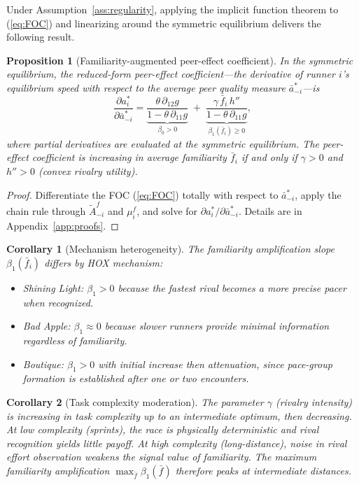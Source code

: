\documentclass[12pt]{article}
\newtheorem{proposition}{Proposition}
\newtheorem{corollary}{Corollary}
\theoremstyle{definition}
\theoremstyle{remark}
\begin{document}
Under Assumption~\ref{ass:regularity}, applying the implicit function theorem
to (\ref{eq:FOC}) and linearizing around the symmetric equilibrium delivers
the following result.

\begin{proposition}[Familiarity-augmented peer-effect coefficient]
\label{prop:main}
In the symmetric equilibrium, the reduced-form peer-effect coefficient---the
derivative of runner $i$'s equilibrium speed with respect to the average peer
quality measure $\bar{a}_{-i}^*$---is
\begin{equation}
\frac{\partial a_i^*}{\partial \bar{a}_{-i}^*} =
\underbrace{\frac{\theta\,\partial_{12}g}{1-\theta\,\partial_{11}g}}_{\beta_0 > 0}
\;+\;
\underbrace{\frac{\gamma\,\bar{f}_i\,h''}{1-\theta\,\partial_{11}g}}_{\beta_1(\bar{f}_i) \ge 0},
\label{eq:beta_familiarity}
\end{equation}
where partial derivatives are evaluated at the symmetric equilibrium.
The peer-effect coefficient is increasing in average familiarity $\bar{f}_i$
if and only if $\gamma > 0$ and $h'' > 0$ (convex rivalry utility).
\end{proposition}

\begin{proof}
Differentiate the FOC (\ref{eq:FOC}) totally with respect to $\bar{a}_{-i}^*$,
apply the chain rule through $\tilde{A}_{-i}^f$ and $\mu_i^f$, and solve for
$\partial a_i^*/\partial \bar{a}_{-i}^*$.
Details are in Appendix~\ref{app:proofs}.
\end{proof}

\begin{corollary}[Mechanism heterogeneity]
\label{cor:mechanism}
The familiarity amplification slope $\beta_1(\bar{f}_i)$ differs by HOX mechanism:
\begin{itemize}[noitemsep]
\item \emph{Shining Light}: $\beta_1 > 0$ because the fastest rival becomes a more
      precise pacer when recognized.
\item \emph{Bad Apple}: $\beta_1 \approx 0$ because slower runners provide minimal
      information regardless of familiarity.
\item \emph{Boutique}: $\beta_1 > 0$ with initial increase then attenuation, since
      pace-group formation is established after one or two encounters.
\end{itemize}
\end{corollary}

\begin{corollary}[Task complexity moderation]
\label{cor:complexity}
The parameter $\gamma$ (rivalry intensity) is increasing in task complexity up
to an intermediate optimum, then decreasing. At low complexity (sprints), the
race is physically deterministic and rival recognition yields little payoff.
At high complexity (long-distance), noise in rival effort observation weakens
the signal value of familiarity. The maximum familiarity amplification
$\max_{\bar{f}}\beta_1(\bar{f})$ therefore peaks at intermediate distances.
\end{corollary}
\end{document}
